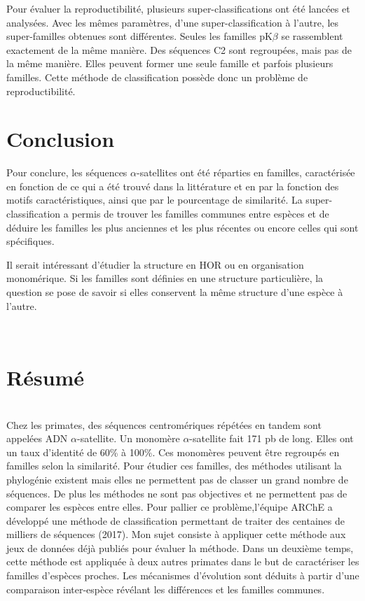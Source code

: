 \documentclass[12pt,a4paper]{article}
\begin{document}
	Pour évaluer la reproductibilité,  plusieurs super-classifications ont été lancées et analysées. Avec les mêmes paramètres, d'une super-classification à l'autre, les super-familles obtenues sont différentes. Seules les familles pK$\beta$ se rassemblent exactement de la même manière. Des séquences C2 sont regroupées, mais pas de la même manière. Elles peuvent former une seule famille et parfois plusieurs familles. Cette méthode de classification possède donc un problème de reproductibilité.  
	
\section{Conclusion}
	Pour conclure, les séquences  $\alpha$-satellites ont été réparties en familles, caractérisée en fonction de ce qui a été trouvé dans la littérature et en par la fonction des motifs caractéristiques, ainsi que par le pourcentage de similarité.  La super-classification a permis de trouver les familles communes entre espèces et de déduire les familles les plus anciennes et les plus récentes ou encore celles qui sont spécifiques.
	
	Il serait intéressant d'étudier la structure en HOR ou en organisation monomérique. Si les familles sont définies en une structure particulière, la question se pose de savoir si elles conservent la même structure d'une espèce à l'autre.

\newpage
\strut  ~  \mbox{}  \null
\newpage
  

\newpage 
\thispagestyle{empty}
\section*{Résumé}~\\[0.2cm]
Chez les primates, des séquences centromériques répétées en tandem sont appelées ADN $\alpha$-satellite. Un monomère $\alpha$-satellite fait 171 pb de long. Elles ont un taux d'identité de 60\% à 100\%. Ces monomères peuvent être regroupés en familles selon la similarité. Pour étudier ces familles, des méthodes utilisant la phylogénie existent mais elles ne permettent pas de classer un grand nombre de séquences. De plus les méthodes ne sont pas objectives et ne permettent pas de comparer les espèces entre elles. Pour pallier ce problème,l'équipe ARChE a développé une méthode de classification permettant de traiter des centaines de milliers de séquences (2017). Mon sujet consiste à appliquer cette méthode aux jeux de données déjà publiés pour évaluer la méthode. Dans un deuxième temps, cette méthode est appliquée à deux autres primates dans le but de  caractériser les familles d'espèces proches. Les mécanismes d'évolution sont déduits à partir d'une comparaison inter-espèce révélant les différences et les familles communes. 
\end{document}
